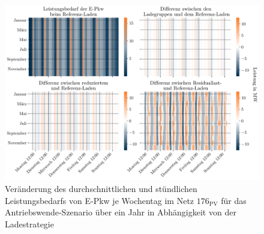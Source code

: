 \begin{figure}[H]
    \centering
    \includegraphics[width=\textwidth]{Bilder/residual_load_diff}
    \caption[Veränderung des durchschnittlichen und stündlichen Leistungsbedarfs von E-Pkw je Wochentag im Netz \num{176} für das Antriebswende-Szenario über ein Jahr in Abhängigkeit von der Ladestrategie]{Veränderung des durchschnittlichen und stündlichen Leistungsbedarfs von E-Pkw je Wochentag im Netz \(176_{\text{PV}}\) für das Antriebswende-Szenario über ein Jahr in Abhängigkeit von der Ladestrategie}\label{fig:residual_load_diff}
\end{figure}